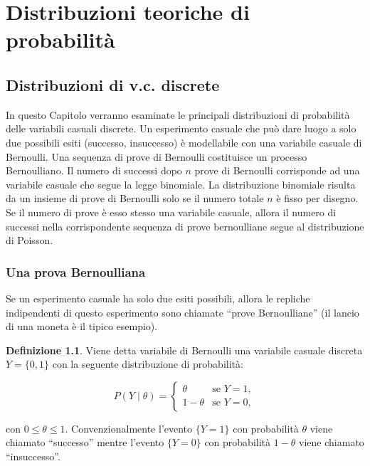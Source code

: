 \documentclass[
  11pt,
]{krantz}
\theoremstyle{definition}
\newtheorem{definition}{Definizione}[chapter]
\theoremstyle{definition}
\theoremstyle{definition}
\theoremstyle{definition}
\theoremstyle{remark}
\begin{document}
\mainmatter

\hypertarget{part-distribuzioni-teoriche-di-probabilituxe0}{%
\part{Distribuzioni teoriche di probabilità}\label{part-distribuzioni-teoriche-di-probabilituxe0}}

\hypertarget{distr-rv-discr}{%
\chapter{Distribuzioni di v.c. discrete}\label{distr-rv-discr}}

In questo Capitolo verranno esaminate le principali distribuzioni di probabilità delle variabili casuali discrete. Un esperimento casuale che può dare luogo a solo due possibili esiti (successo, insuccesso) è modellabile con una variabile casuale di Bernoulli. Una sequenza di prove di Bernoulli costituisce un processo Bernoulliano. Il numero di successi dopo \(n\) prove di Bernoulli corrisponde ad una variabile casuale che segue la legge binomiale. La distribuzione binomiale risulta da un insieme di prove di Bernoulli solo se il numero totale \(n\) è fisso per disegno. Se il numero di prove è esso stesso una variabile casuale, allora il numero di successi nella corrispondente sequenza di prove bernoulliane segue al distribuzione di Poisson.

\hypertarget{una-prova-bernoulliana}{%
\section{Una prova Bernoulliana}\label{una-prova-bernoulliana}}

Se un esperimento casuale ha solo due esiti possibili, allora le repliche indipendenti di questo esperimento sono chiamate ``prove Bernoulliane'' (il lancio di una moneta è il tipico esempio).

\begin{definition}
Viene detta variabile di Bernoulli una variabile casuale discreta \(Y = \{0, 1\}\) con la seguente distribuzione di probabilità:

\[
P(Y \mid \theta) =
  \begin{cases}
    \theta     & \text{se $Y = 1$}, \\
    1 - \theta & \text{se $Y = 0$},
  \end{cases}
\]

con \(0 \leq \theta \leq 1\). Convenzionalmente l'evento \(\{Y = 1\}\) con probabilità \(\theta\) viene chiamato ``successo'' mentre l'evento \(\{Y = 0\}\) con probabilità \(1-\theta\) viene chiamato ``insuccesso''.
\end{definition}
\end{document}
